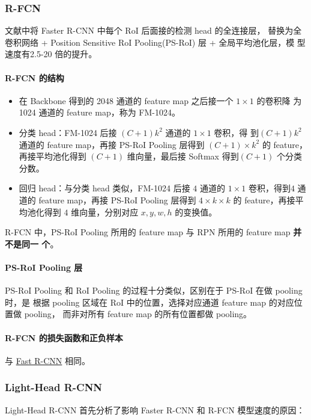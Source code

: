 \subsubsection{R-FCN}
文献中将 Faster R-CNN 中每个 RoI 后面接的检测 head 的全连接层，
替换为全卷积网络 + Position Sensitive RoI Pooling(PS-RoI) 层 + 全局平均池化层，模
型速度有2.5-20 倍的提升。

\paragraph{R-FCN 的结构}

\begin{itemize}
  \item 在 Backbone 得到的 2048 通道的 feature map 之后接一个 $1 \times 1$ 的卷积降
    为 1024 通道的 feature map，称为 FM-1024。
  \item 分类 head：FM-1024 后接 $(C+1)k^2$ 通道的 $1 \times 1$ 卷积，得
    到$(C+1)k^2$ 通道的 feature map，再接 PS-RoI Pooling 层得到 $(C+1) \times
    k^2$ 的 feature，再接平均池化得到 $(C+1)$ 维向量，最后接 Softmax 得到$(C+1)$
    个分类分数。
  \item 回归 head：与分类 head 类似，FM-1024 后接 $4$ 通道的 $1 \times 1$
    卷积，得到$4$ 通道的 feature map，再接 PS-RoI Pooling 层得到 $4
    \times k \times k$ 的 feature，再接平均池化得到 $4$ 维向量，分别对应 $x, y,
    w, h$ 的变换值。
\end{itemize}

R-FCN 中，PS-RoI Pooling 所用的 feature map 与 RPN 所用的 feature map \textbf{并不是同一
个}。

\paragraph{PS-RoI Pooling 层}
PS-RoI Pooling 和 RoI Pooling 的过程十分类似，区别在于 PS-RoI 在做 pooling 时，是
根据 pooling 区域在 RoI 中的位置，选择对应通道 feature map 的对应位置做 pooling，
而非对所有 feature map 的所有位置都做 pooling。

\paragraph{R-FCN 的损失函数和正负样本}
与 \hyperref[subsec:Fast-R-CNN]{Fast R-CNN} 相同。

\subsubsection{Light-Head R-CNN}
Light-Head R-CNN 首先分析了影响 Faster R-CNN 和 R-FCN 模型速度的原因：

